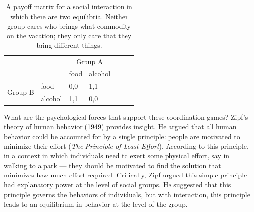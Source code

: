 \documentclass[man, noapacite, 12pt]{apa2}
\begin{document}
\begin{table}[t]
\begin{center}
\begin{tabular}{l p{3cm} l p{3cm} l p{3cm} l}
 &  & \multicolumn{2}{c}{Group A} \\ \cline{2-4} 
\multicolumn{1}{l|}{} & \multicolumn{1}{l|}{} & \multicolumn{1}{l|}{food} & \multicolumn{1}{l|}{alcohol} \\ \cline{2-4} 
\multicolumn{1}{c|}{\multirow{2}{*}{Group B}} & \multicolumn{1}{l|}{food} & \multicolumn{1}{l|}{0,0} & \multicolumn{1}{l|}{1,1} \\ \cline{2-4} 
\multicolumn{1}{c|}{} & \multicolumn{1}{l|}{alcohol} & \multicolumn{1}{l|}{1,1} & \multicolumn{1}{l|}{0,0} \\ \cline{2-4} 
\end{tabular}
\caption{A payoff matrix for a social interaction in which there are two equilibria. Neither group cares who brings what commodity on the vacation; they only care that they bring different things. }
\end{center}
\end{table}

What are the psychological forces that support these coordination games? Zipf's theory of human behavior (1949) provides  insight. He argued that all human behavior could be accounted for by a single principle: people are motivated to minimize their effort ({\it The Principle of Least Effort}).  According to this principle, in a context in which individuals need to exert some physical effort, say in walking to a park --- they should be motivated to find the solution that minimizes how much effort required. Critically, Zipf argued this simple principle had explanatory power at the level of social groups. He suggested that this principle governs the behaviors of individuals, but with interaction, this principle leads to an equilibrium in behavior at the level of the group.
\end{document}
